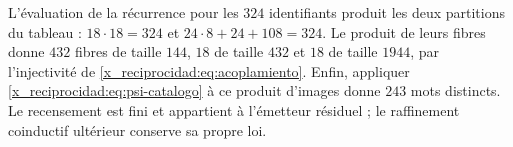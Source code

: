 L’évaluation de la récurrence pour les \(324\) identifiants produit
les deux partitions du tableau : \(18\cdot18=324\) et
\(24\cdot8+24+108=324\). Le produit de leurs fibres donne
\(432\) fibres de taille \(144\), \(18\) de taille \(432\) et \(18\)
de taille \(1944\), par l’injectivité de \eqref{x_reciprocidad:eq:acoplamiento}.
Enfin, appliquer \eqref{x_reciprocidad:eq:psi-catalogo} à ce produit d’images
donne \(243\) mots distincts. Le recensement est fini et appartient à l’émetteur
résiduel ; le raffinement coinductif ultérieur conserve sa propre loi.

